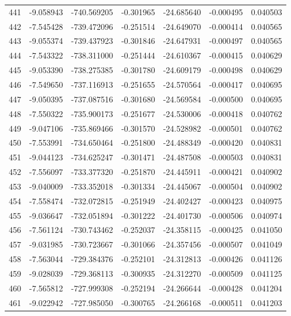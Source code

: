 \begin{tabular}{rrrrrrr}
 441 &  -9.058943 & -740.569205 & -0.301965 & -24.685640 &  -0.000495 &  0.040503 \\
 442 &  -7.545428 & -739.472096 & -0.251514 & -24.649070 &  -0.000414 &  0.040565 \\
 443 &  -9.055374 & -739.437923 & -0.301846 & -24.647931 &  -0.000497 &  0.040565 \\
 444 &  -7.543322 & -738.311000 & -0.251444 & -24.610367 &  -0.000415 &  0.040629 \\
 445 &  -9.053390 & -738.275385 & -0.301780 & -24.609179 &  -0.000498 &  0.040629 \\
 446 &  -7.549650 & -737.116913 & -0.251655 & -24.570564 &  -0.000417 &  0.040695 \\
 447 &  -9.050395 & -737.087516 & -0.301680 & -24.569584 &  -0.000500 &  0.040695 \\
 448 &  -7.550322 & -735.900173 & -0.251677 & -24.530006 &  -0.000418 &  0.040762 \\
 449 &  -9.047106 & -735.869466 & -0.301570 & -24.528982 &  -0.000501 &  0.040762 \\
 450 &  -7.553991 & -734.650464 & -0.251800 & -24.488349 &  -0.000420 &  0.040831 \\
 451 &  -9.044123 & -734.625247 & -0.301471 & -24.487508 &  -0.000503 &  0.040831 \\
 452 &  -7.556097 & -733.377320 & -0.251870 & -24.445911 &  -0.000421 &  0.040902 \\
 453 &  -9.040009 & -733.352018 & -0.301334 & -24.445067 &  -0.000504 &  0.040902 \\
 454 &  -7.558474 & -732.072815 & -0.251949 & -24.402427 &  -0.000423 &  0.040975 \\
 455 &  -9.036647 & -732.051894 & -0.301222 & -24.401730 &  -0.000506 &  0.040974 \\
 456 &  -7.561124 & -730.743462 & -0.252037 & -24.358115 &  -0.000425 &  0.041050 \\
 457 &  -9.031985 & -730.723667 & -0.301066 & -24.357456 &  -0.000507 &  0.041049 \\
 458 &  -7.563044 & -729.384376 & -0.252101 & -24.312813 &  -0.000426 &  0.041126 \\
 459 &  -9.028039 & -729.368113 & -0.300935 & -24.312270 &  -0.000509 &  0.041125 \\
 460 &  -7.565812 & -727.999308 & -0.252194 & -24.266644 &  -0.000428 &  0.041204 \\
 461 &  -9.022942 & -727.985050 & -0.300765 & -24.266168 &  -0.000511 &  0.041203 \\

\end{tabular}
